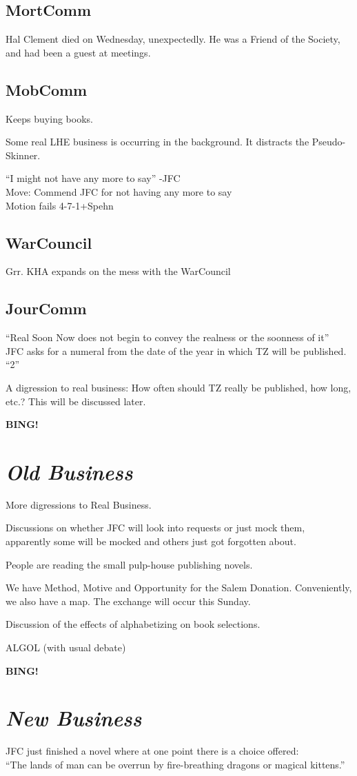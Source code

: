 \documentclass[10pt]{article}
\newcommand{\bing}{{\bf BING!} }
\newcommand{\goto}[1]{\bing \vskip 12pt \section*{{\em{#1}}}}
\begin{document}
\subsection*{MortComm}
Hal Clement died on Wednesday, unexpectedly.  He was a Friend of the
Society, and had been a guest at meetings.

\subsection*{MobComm}
Keeps buying books.

Some real LHE business is occurring in the background. It distracts the
Pseudo-Skinner.

``I might not have any more to say'' -JFC \\
Move: Commend JFC for not having any more to say\\
Motion fails 4-7-1+Spehn

\subsection*{WarCouncil}
Grr.  KHA expands on the mess with the WarCouncil

\subsection*{JourComm}
``Real Soon Now does not begin to convey the realness or the soonness of it''\\
JFC asks for a numeral from the date of the year in which TZ will be
published.\\
``2''

A digression to real business: How often should TZ really be
published, how long, etc.?  This will be discussed later.

\goto{Old Business}
More digressions to Real Business.

Discussions on whether JFC will look into requests or just mock them,
apparently some will be mocked and others just got forgotten about.

People are reading the small pulp-house publishing novels.

We have Method, Motive and Opportunity for the Salem
Donation. Conveniently, we also have a map.  The exchange will occur
this Sunday.

Discussion of the effects of alphabetizing on book selections.

ALGOL (with usual debate)

\goto{New Business}
JFC just finished a novel where at one point there is a choice
offered:\\
``The lands of man can be overrun by fire-breathing dragons or magical kittens.''
\end{document}
